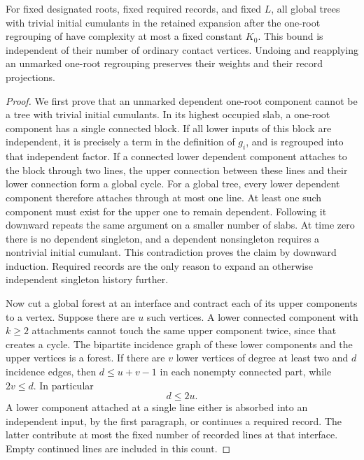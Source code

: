 \begin{lemma}\label{lem:sharp-tree-completeness}
For fixed designated roots, fixed required records, and fixed
\(L\), all global trees with trivial initial cumulants in the
retained expansion after the one-root regrouping of
 have complexity at most a fixed constant
\(K_0\).  This bound is independent of their number of ordinary
contact vertices.  Undoing and reapplying an unmarked one-root
regrouping preserves their weights and their record projections.
\end{lemma}

\begin{proof}
We first prove that an unmarked dependent one-root component
cannot be a tree with trivial initial cumulants.  In its highest
occupied slab, a one-root component has a single connected
block.  If all lower inputs of this block are independent, it
is precisely a term in the definition of \(g_i\), and is
regrouped into that independent factor.  If a connected lower
dependent component attaches to the block through two lines,
the upper connection between these lines and their lower
connection form a global cycle.  For a global tree, every
lower dependent component therefore attaches through at most
one line.  At least one such component must exist for the
upper one to remain dependent.  Following it downward repeats
the same argument on a smaller number of slabs.  At time zero
there is no dependent singleton, and a dependent nonsingleton
requires a nontrivial initial cumulant.  This contradiction
proves the claim by downward induction.  Required records are
the only reason to expand an otherwise independent singleton
history further.

Now cut a global forest at an interface and contract each of
its upper components to a vertex.  Suppose there are \(u\)
such vertices.  A lower connected component with \(k\ge2\)
attachments cannot touch the same upper component twice, since
that creates a cycle.  The bipartite incidence graph of these
lower components and the upper vertices is a forest.  If there
are \(v\) lower vertices of degree at least two and \(d\)
incidence edges, then \(d\le u+v-1\) in each nonempty connected
part, while \(2v\le d\).  In particular
\begin{equation}\label{eq:sharp-crossing-bound}
                               d\le 2u.
\end{equation}
A lower component attached at a single line either is absorbed
into an independent input, by the first paragraph, or continues
a required record.  The latter contribute at most the fixed
number of recorded lines at that interface.  Empty continued
lines are included in this count.


\end{proof}
